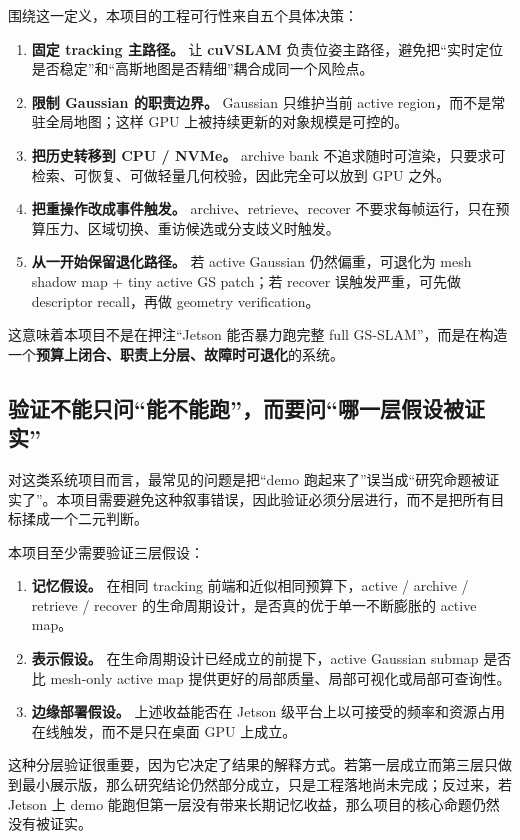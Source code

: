 \documentclass[12pt]{article}
\newcommand{\cuvslam}{\textbf{cuVSLAM}}
\begin{document}
围绕这一定义，本项目的工程可行性来自五个具体决策：
\begin{enumerate}
  \item \textbf{固定 tracking 主路径。} 让 \cuvslam{} 负责位姿主路径，避免把“实时定位是否稳定”和“高斯地图是否精细”耦合成同一个风险点。
  \item \textbf{限制 Gaussian 的职责边界。} Gaussian 只维护当前 active region，而不是常驻全局地图；这样 GPU 上被持续更新的对象规模是可控的。
  \item \textbf{把历史转移到 CPU / NVMe。} archive bank 不追求随时可渲染，只要求可检索、可恢复、可做轻量几何校验，因此完全可以放到 GPU 之外。
  \item \textbf{把重操作改成事件触发。} archive、retrieve、recover 不要求每帧运行，只在预算压力、区域切换、重访候选或分支歧义时触发。
  \item \textbf{从一开始保留退化路径。} 若 active Gaussian 仍然偏重，可退化为 mesh shadow map + tiny active GS patch；若 recover 误触发严重，可先做 descriptor recall，再做 geometry verification。
\end{enumerate}

这意味着本项目不是在押注“Jetson 能否暴力跑完整 full GS-SLAM”，而是在构造一个\textbf{预算上闭合、职责上分层、故障时可退化}的系统。

\subsection{验证不能只问“能不能跑”，而要问“哪一层假设被证实”}

对这类系统项目而言，最常见的问题是把“demo 跑起来了”误当成“研究命题被证实了”。本项目需要避免这种叙事错误，因此验证必须分层进行，而不是把所有目标揉成一个二元判断。

本项目至少需要验证三层假设：
\begin{enumerate}
  \item \textbf{记忆假设。} 在相同 tracking 前端和近似相同预算下，active / archive / retrieve / recover 的生命周期设计，是否真的优于单一不断膨胀的 active map。
  \item \textbf{表示假设。} 在生命周期设计已经成立的前提下，active Gaussian submap 是否比 mesh-only active map 提供更好的局部质量、局部可视化或局部可查询性。
  \item \textbf{边缘部署假设。} 上述收益能否在 Jetson 级平台上以可接受的频率和资源占用在线触发，而不是只在桌面 GPU 上成立。
\end{enumerate}

这种分层验证很重要，因为它决定了结果的解释方式。若第一层成立而第三层只做到最小展示版，那么研究结论仍然部分成立，只是工程落地尚未完成；反过来，若 Jetson 上 demo 能跑但第一层没有带来长期记忆收益，那么项目的核心命题仍然没有被证实。
\end{document}
